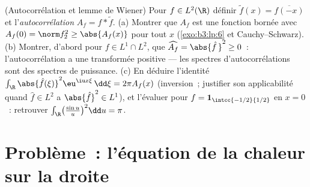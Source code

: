 \begin{exercise}[$\star\star$]\label{exo:b3:fouriertransform:12}
(Autocorrélation et lemme de Wiener) Pour $f \in L^2(\R)$
définir $\tilde f(x) = \overline{f(-x)}$ et
l'\emph{autocorrélation} $A_f = f * \tilde f$.
(a) Montrer que $A_f$ est une fonction  bornée avec
$A_f(0) = \norm f_2^2 \geq \abs{A_f(x)}$ pour tout $x$
(\cref{exo:b3:lp:6} et Cauchy--Schwarz).
(b) Montrer, d'abord pour $f \in L^1\cap L^2$, que
$\widehat{A_f} = \abs{\hat f\,}^2 \geq 0$~: l'autocorrélation
a une transformée positive --- les spectres d'autocorrélations
sont des spectres de puissance.
(c) En déduire l'identité $\int_\R\abs{\hat
f(\xi)}^2\eu^{\iu x\xi}\,\dd\xi = 2\pi A_f(x)$ (inversion~;
justifier son applicabilité quand $\hat f \in L^2$ a
$\abs{\hat f}^2 \in L^1$), et l'évaluer pour $f = \mathbf
1_{\intcc{-1/2}{1/2}}$ en $x = 0$~: retrouver
$\int_\R\bigl(\frac{\sin u}u\bigr)^2\dd u = \pi$.
\end{exercise}

\section{Problème~: l'équation de la chaleur sur la droite}

